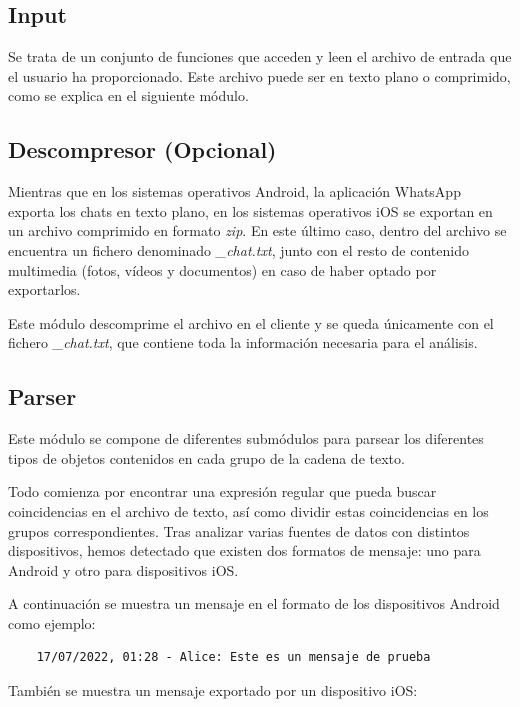 
\subsection{Input}

Se trata de un conjunto de funciones que acceden y leen el archivo de entrada que el usuario ha proporcionado. Este archivo puede ser en texto plano o comprimido, como se explica en el siguiente módulo.

\subsection{Descompresor (Opcional)}

Mientras que en los sistemas operativos Android, la aplicación WhatsApp exporta los chats en texto plano, en los sistemas operativos iOS se exportan en un archivo comprimido en formato \textit{zip}. En este último caso, dentro del archivo se encuentra un fichero denominado \textit{\_chat.txt}, junto con el resto de contenido multimedia (fotos, vídeos y documentos) en caso de haber optado por exportarlos.

Este módulo descomprime el archivo en el cliente y se queda únicamente con el fichero \textit{\_chat.txt}, que contiene toda la información necesaria para el análisis.

\subsection{Parser}

Este módulo se compone de diferentes submódulos para parsear los diferentes tipos de objetos contenidos en cada grupo de la cadena de texto.

Todo comienza por encontrar una expresión regular que pueda buscar coincidencias en el archivo de texto, así como dividir estas coincidencias en los grupos correspondientes. Tras analizar varias fuentes de datos con distintos dispositivos, hemos detectado que existen dos formatos de mensaje: uno para Android y otro para dispositivos iOS.

A continuación se muestra un mensaje en el formato de los dispositivos Android como ejemplo:

\begin{lstlisting}
	17/07/2022, 01:28 - Alice: Este es un mensaje de prueba
\end{lstlisting}

También se muestra un mensaje exportado por un dispositivo iOS:

